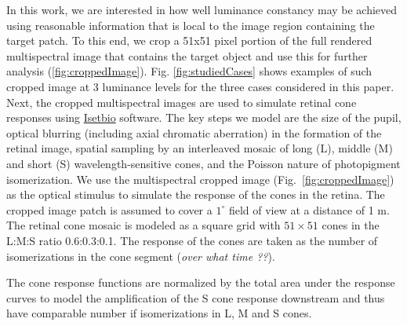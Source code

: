 \documentclass{jov}
\begin{document}
In this work, we are interested in how well luminance constancy may be achieved using reasonable information that is local to the image region containing the target patch. 
To this end, we crop a 51x51 pixel portion of the full rendered multispectral image that contains the target object and use this for further analysis (\ref{fig:croppedImage}).
Fig. \ref{fig:studiedCases} shows examples of such cropped image at 3 luminance levels for the three cases considered in this paper.
Next, the cropped multispectral images are used to simulate retinal cone responses using \href{https://github.com/isetbio}{Isetbio} software. The key steps we model are the size of the pupil, optical blurring (including axial chromatic aberration) in the formation of the retinal image, spatial sampling by an interleaved mosaic of long (L), middle (M)  and short (S) wavelength-sensitive cones, and the Poisson nature of photopigment isomerization.
We use the multispectral cropped image (Fig.~\ref{fig:croppedImage}) as the optical stimulus to simulate the response of the cones in the retina. The cropped image patch is assumed to cover a $1^{\circ}$ field of view at a distance of 1 m. The retinal cone mosaic is modeled as a square grid with $51 \times 51$ cones in the L:M:S ratio 0.6:0.3:0.1. The response of the cones are taken as the number of isomerizations in the cone segment ({\it over what time ??}).

The cone response functions are normalized by the total area under the response curves to model the amplification of the S cone response downstream and thus have comparable number if isomerizations in L, M and S cones. 
\end{document}
